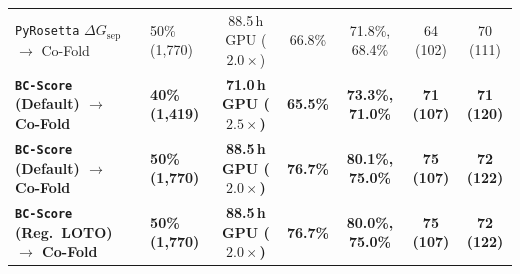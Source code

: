 \documentclass[10pt,twocolumn]{article}
\begin{document}
\begin{table}[p]
{\begin{tabular}{@{}llccccc@{}}
\hspace{0.4em}\texttt{PyRosetta} $\Delta G_{\text{sep}}$ $\to$ Co-Fold & 50\% (1,770) & 88.5\,h GPU ($2.0\times$) & 66.8\% & 71.8\%, 68.4\% & 64 (102) & 70 (111) \\
\hspace{0.4em}\textbf{\texttt{BC-Score} (Default) $\to$ Co-Fold} & \textbf{40\% (1,419)} & \textbf{71.0\,h GPU ($2.5\times$)} & \textbf{65.5\%} & \textbf{73.3\%, 71.0\%} & \textbf{71 (107)} & \textbf{71 (120)} \\
\hspace{0.4em}\textbf{\texttt{BC-Score} (Default) $\to$ Co-Fold} & \textbf{50\% (1,770)} & \textbf{88.5\,h GPU ($2.0\times$)} & \textbf{76.7\%} & \textbf{80.1\%, 75.0\%} & \textbf{75 (107)} & \textbf{72 (122)} \\
\hspace{0.4em}\textbf{\texttt{BC-Score} (Reg.\ LOTO) $\to$ Co-Fold} & \textbf{50\% (1,770)} & \textbf{88.5\,h GPU ($2.0\times$)} & \textbf{76.7\%} & \textbf{80.0\%, 75.0\%} & \textbf{75 (107)} & \textbf{72 (122)} \\
\bottomrule
\end{tabular}%
}
\end{table}
\clearpage
\end{document}
